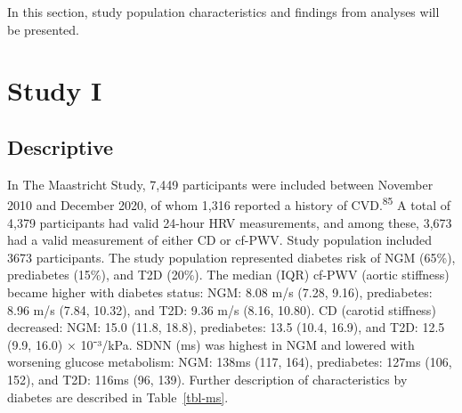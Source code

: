 \documentclass[
  a4paper,
  headsepline=true,
  open=left]{scrbook}
\begin{document}
\clearpage
\null
\thispagestyle{empty}
\clearpage

In this section, study population characteristics and findings from
analyses will be presented.

\hypertarget{study-i}{%
\section{Study I}\label{study-i}}

\hypertarget{descriptive}{%
\subsection{Descriptive}\label{descriptive}}

In The Maastricht Study, 7,449 participants were included between
November 2010 and December 2020, of whom 1,316 reported a history of
CVD.\textsuperscript{85} A total of 4,379 participants had valid 24-hour
HRV measurements, and among these, 3,673 had a valid measurement of
either CD or cf-PWV. Study population included 3673 participants. The
study population represented diabetes risk of NGM (65\%), prediabetes
(15\%), and T2D (20\%). The median (IQR) cf-PWV (aortic stiffness)
became higher with diabetes status: NGM: 8.08 m/s (7.28, 9.16),
prediabetes: 8.96 m/s (7.84, 10.32), and T2D: 9.36 m/s (8.16, 10.80). CD
(carotid stiffness) decreased: NGM: 15.0 (11.8, 18.8), prediabetes: 13.5
(10.4, 16.9), and T2D: 12.5 (9.9, 16.0) × 10⁻³/kPa. SDNN (ms) was
highest in NGM and lowered with worsening glucose metabolism: NGM: 138ms
(117, 164), prediabetes: 127ms (106, 152), and T2D: 116ms (96, 139).
Further description of characteristics by diabetes are described in
Table~\ref{tbl-ms}.

\end{document}
